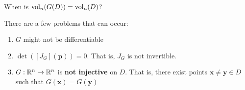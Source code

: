 \begin{motivating}
    When is $\textnormal{vol}_n(G(D)) = \textnormal{vol}_n(D)$?
\end{motivating}

There are a few problems that can occur:

    \begin{enumerate}
        \item $G$ might not be differentiable
        \item $\det([J_G](\bm{p})) = 0$.  That is, $J_G$ is not invertible.
        \item $G : \mathbb{R}^n \to \mathbb{R}^n$ is \textbf{not injective} on $D$.  That is, there exist points $\bm{x} \neq \bm{y} \in 
        D$ such that $G(\bm{x}) = G(\bm{y})$
    \end{enumerate}


